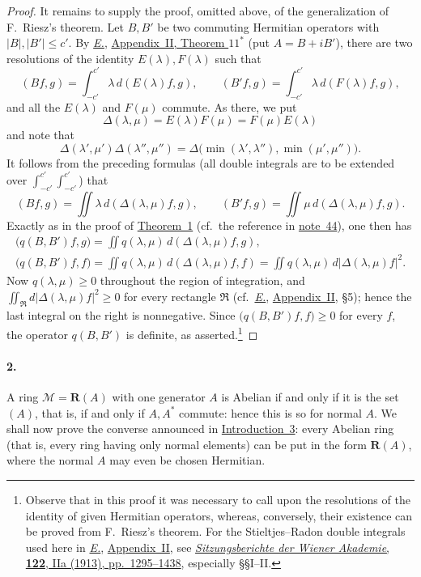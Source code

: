 \documentclass[
  paper=b5,
  twoside=true,
  fontsize=13pt,
  headings=normal,
  bookmarkpackage=false
]{scrartcl}
\theoremstyle{definition}
\newcommand{\NoteRef}[1]{\hyperref[fn:#1]{note~#1}}
\newcommand{\TheoremRef}[1]{\hyperref[thm:#1]{Theorem~#1}}
\newcommand{\Eref}{\hyperref[fn:E-paper]{\emph{E.}}}
\newcommand{\ErefText}[1]{\href{https://doi.org/10.1007/BF01782338}{#1}}
\newcommand{\GeneratedRing}{\boldsymbol{R}}
\begin{document}
\begin{proof}
\label{proof:riesz-two-operators}%
It remains to supply the proof, omitted above, of the generalization of
F.~Riesz's theorem. Let \(B,B'\) be two commuting Hermitian operators
with \(\lvert B\rvert,\lvert B'\rvert\leq c'\). By \Eref, \ErefText{Appendix~II, Theorem \(11^*\)} (put \(A=B+iB'\)), there are two
resolutions of the identity \(E(\lambda),F(\lambda)\) such that
\[
  (Bf,g)=\int_{-c'}^{c'}\lambda\,d(E(\lambda)f,g),
  \qquad
  (B'f,g)=\int_{-c'}^{c'}\lambda\,d(F(\lambda)f,g),
\]
and all the \(E(\lambda)\) and \(F(\mu)\) commute. As there, we put
\[
  \Delta(\lambda,\mu)=E(\lambda)F(\mu)=F(\mu)E(\lambda)
\]
and note that
\[
  \Delta(\lambda',\mu')\Delta(\lambda'',\mu'')
  =
  \Delta\bigl(\min(\lambda',\lambda''),\min(\mu',\mu'')\bigr).
\]
It follows from the preceding formulas (all double integrals are to be
extended over
\(\int_{-c'}^{c'}\int_{-c'}^{c'}\)) that
\[
  (Bf,g)=\iint\lambda\,d(\Delta(\lambda,\mu)f,g),
  \qquad
  (B'f,g)=\iint\mu\,d(\Delta(\lambda,\mu)f,g).
\]
Exactly as in the proof of \TheoremRef{1} (cf.\ the reference in
\NoteRef{44}), one then has
\begin{gather*}
  \bigl(q(B,B')f,g\bigr)
  =\iint q(\lambda,\mu)\,d(\Delta(\lambda,\mu)f,g),\\
  \bigl(q(B,B')f,f\bigr)
  =\iint q(\lambda,\mu)\,d(\Delta(\lambda,\mu)f,f)
  =\iint q(\lambda,\mu)\,d\lvert\Delta(\lambda,\mu)f\rvert^2.
\end{gather*}
Now \(q(\lambda,\mu)\geq0\) throughout the region of integration, and
\(\iint_{\mathfrak R}d\lvert\Delta(\lambda,\mu)f\rvert^2\geq0\)
for every rectangle \(\mathfrak R\) (cf.\ \Eref, \ErefText{Appendix~II},
\S5); hence the last integral on the right is nonnegative.  Since
\(\bigl(q(B,B')f,f\bigr)\geq0\) for every \(f\), the operator
\(q(B,B')\) is definite, as asserted.\footnote{\label{fn:56}Observe that in this
proof it was necessary to call upon the resolutions of the identity of
given Hermitian operators, whereas, conversely, their existence can be
proved from F.~Riesz's theorem.  For the Stieltjes--Radon double
integrals used here in \Eref, \ErefText{Appendix~II}, see
\href{https://books.google.fr/books?id=xMlLAAAAYAAJ}{\emph{Sitzungsberichte der Wiener Akademie}, \textbf{122}, IIa (1913), pp.~1295--1438}, especially \S\S I--II.}
\end{proof}

\paragraph*{2.}\label{sec:iii-2}
A ring \(\mathcal M=\GeneratedRing (A)\) with one generator \(A\) is Abelian if and
only if it is the set \((A)\), that is, if and only if \(A,A^*\)
commute: hence this is so for normal \(A\).  We shall now prove the
converse announced in \hyperref[intro:3]{Introduction~3}: every Abelian ring (that is, every
ring having only normal elements) can be put in the form \(\GeneratedRing (A)\), where
the normal \(A\) may even be chosen Hermitian.
\end{document}
